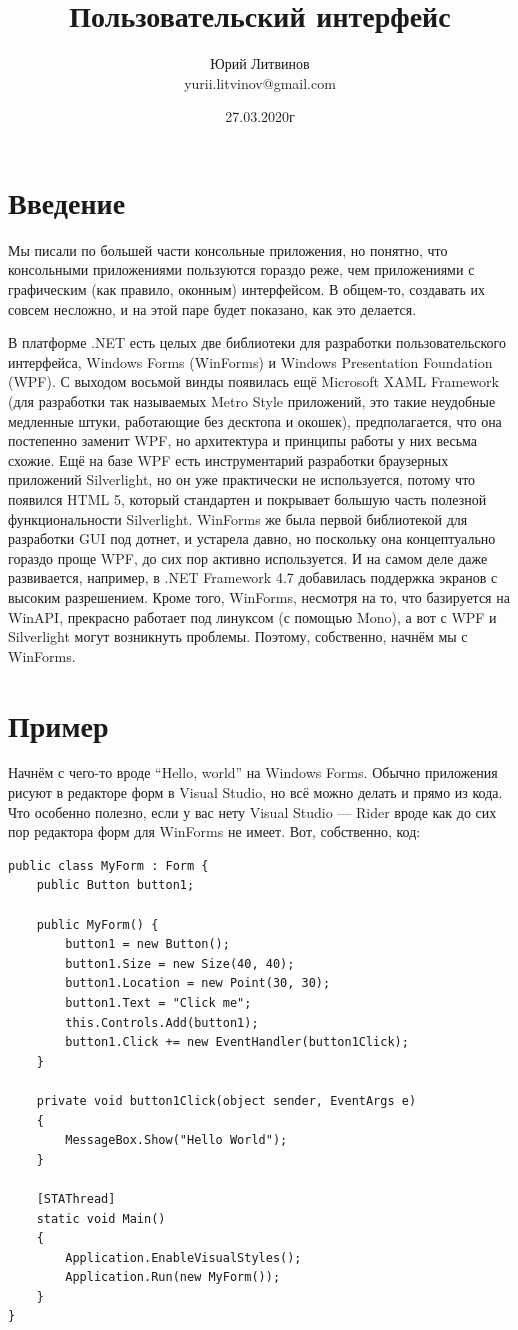 \documentclass[a5paper]{article}
\title{Пользовательский интерфейс}
\author{Юрий Литвинов\\\small{yurii.litvinov@gmail.com}}
\date{27.03.2020г}
\begin{document}
\maketitle
\thispagestyle{empty}

\section{Введение}

Мы писали по большей части консольные приложения, но понятно, что консольными приложениями пользуются гораздо реже, чем приложениями с графическим (как правило, оконным) интерфейсом. В общем-то, создавать их совсем несложно, и на этой паре будет показано, как это делается. 

В платформе .NET есть целых две библиотеки для разработки пользовательского интерфейса, Windows Forms (WinForms) и Windows Presentation Foundation (WPF). С выходом восьмой винды появилась ещё Microsoft XAML Framework (для разработки так называемых Metro Style приложений, это такие неудобные медленные штуки, работающие без десктопа и окошек), предполагается, что она постепенно заменит WPF, но архитектура и принципы работы у них весьма схожие. Ещё на базе WPF есть инструментарий разработки браузерных приложений Silverlight, но он уже практически не используется, потому что появился HTML 5, который стандартен и покрывает большую часть полезной функциональности Silverlight. WinForms же была первой библиотекой для разработки GUI под дотнет, и устарела давно, но поскольку она концептуально гораздо проще WPF, до сих пор активно используется. И на самом деле даже развивается, например, в .NET Framework 4.7 добавилась поддержка экранов с высоким разрешением. Кроме того, WinForms, несмотря на то, что базируется на WinAPI, прекрасно работает под линуксом (с помощью Mono), а вот с WPF и Silverlight могут возникнуть проблемы. Поэтому, собственно, начнём мы с WinForms.

\section{Пример}

Начнём с чего-то вроде ``Hello, world'' на Windows Forms. Обычно приложения рисуют в редакторе форм в Visual Studio, но всё можно делать и прямо из кода. Что особенно полезно, если у вас нету Visual Studio --- Rider вроде как до сих пор редактора форм для WinForms не имеет. Вот, собственно, код:

\begin{verbatim}
public class MyForm : Form {
    public Button button1;

    public MyForm() {
        button1 = new Button();
        button1.Size = new Size(40, 40);
        button1.Location = new Point(30, 30);
        button1.Text = "Click me";
        this.Controls.Add(button1);
        button1.Click += new EventHandler(button1Click);
    }

    private void button1Click(object sender, EventArgs e)
    {
        MessageBox.Show("Hello World");
    }

    [STAThread]
    static void Main()
    {
        Application.EnableVisualStyles();
        Application.Run(new MyForm());
    }
}
\end{verbatim}
\end{document}
